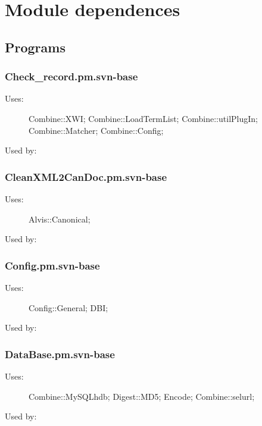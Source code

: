 
\section{Module dependences}
\label{moddep}
\subsection{Programs}
\subsubsection{Check\_record.pm.svn-base}
\begin{description}
\item[Uses:] Combine::XWI; Combine::LoadTermList; Combine::utilPlugIn; Combine::Matcher; Combine::Config; 

\item[Used by:] 

\end{description}
\subsubsection{CleanXML2CanDoc.pm.svn-base}
\begin{description}
\item[Uses:] Alvis::Canonical; 

\item[Used by:] 

\end{description}
\subsubsection{Config.pm.svn-base}
\begin{description}
\item[Uses:] Config::General; DBI; 

\item[Used by:] 

\end{description}
\subsubsection{DataBase.pm.svn-base}
\begin{description}
\item[Uses:] Combine::MySQLhdb; Digest::MD5; Encode; Combine::selurl; 

\item[Used by:] 

\end{description}
